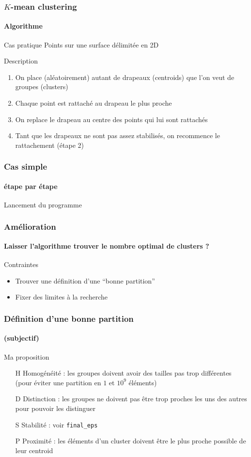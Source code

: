 \documentclass[]{beamer}
\begin{document}
\begin{frame}
  \frametitle{$K$-mean clustering}
  \framesubtitle{Algorithme}
  \begin{exampleblock}{Cas pratique}
    Points sur une surface délimitée en 2D
  \end{exampleblock}

  \begin{block}{Description}
  \begin{enumerate}
    \item On place (aléatoirement) autant de drapeaux (centroids) que l'on veut de groupes (clusters)
    \item Chaque point est rattaché au drapeau le plus proche
    \item On replace le drapeau au centre des points qui lui sont rattachés
    \item Tant que les drapeaux ne sont pas assez stabilisés, on recommence le rattachement (étape \alert{2})
  \end{enumerate}

  \end{block}

\end{frame}

\begin{frame}
  \frametitle{Cas simple}
  \framesubtitle{étape par étape}

  \vfill{}
  \alert{Lancement du programme}
  \vfill{}
\end{frame}

\begin{frame}
  \frametitle{Amélioration}
  \framesubtitle{Laisser l'algorithme trouver le nombre optimal de clusters ?}

  \begin{block}{Contraintes}
    \begin{itemize}
      \item Trouver une définition d'une ``bonne partition''
      \item Fixer des limites à la recherche
    \end{itemize}
  \end{block}
\end{frame}

\begin{frame}
  \frametitle{Définition d'une bonne partition}
  \framesubtitle{(subjectif)}

  \begin{block}{Ma proposition}
       \begin{itemize}
    \item[H] Homogénéité : les groupes doivent avoir des tailles pas trop différentes (pour éviter une partition en $1$ et $10^9$ éléments)
    \item[D] Distinction : les groupes ne doivent pas être trop proches les uns des autres pour pouvoir les distinguer
    \item[S] Stabilité : voir \tt{final\_eps}
    \item[P] Proximité : les éléments d'un cluster doivent être le plus proche possible de leur centroid
  \end{itemize}
  \end{block}
\end{frame}
\end{document}
